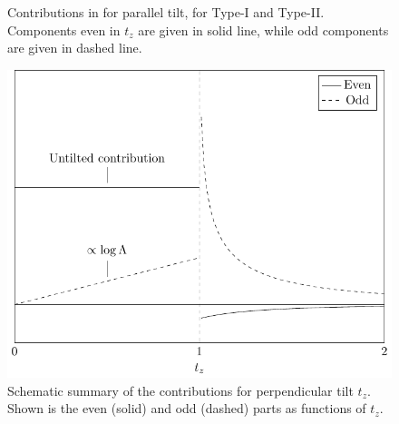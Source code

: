 \documentclass[%
 reprint,
 amsmath,amssymb,
 aps,
]{revtex4-2}
\begin{document}
\begin{figure}
\caption{Contributions in for parallel tilt, for Type-I and Type-II.
  Components even in \( t_z \) are given in solid line, while odd components are given in dashed line.
}
\end{figure}

\begin{figure}[t]
  \centering
  \includegraphics[width=.8\columnwidth]{figures/schematic_tz}
  \caption{Schematic summary of the contributions for perpendicular tilt \(t_z \). Shown is the even (solid) and odd (dashed) parts as functions of \(t_z\).}
  \label{fig:schematic_tz}
\end{figure}
\end{document}
